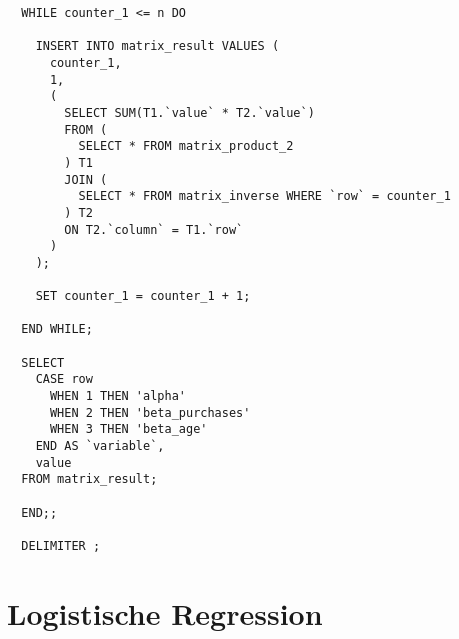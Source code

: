 \begin{verbatim}
  WHILE counter_1 <= n DO

    INSERT INTO matrix_result VALUES (
      counter_1,
      1,
      (
        SELECT SUM(T1.`value` * T2.`value`)
        FROM (
          SELECT * FROM matrix_product_2
        ) T1
        JOIN (
          SELECT * FROM matrix_inverse WHERE `row` = counter_1
        ) T2
        ON T2.`column` = T1.`row`
      )
    );

    SET counter_1 = counter_1 + 1;

  END WHILE;

  SELECT
    CASE row
      WHEN 1 THEN 'alpha'
      WHEN 2 THEN 'beta_purchases'
      WHEN 3 THEN 'beta_age'
    END AS `variable`,
    value
  FROM matrix_result;

  END;;

  DELIMITER ;
\end{verbatim}

\section{Logistische Regression}

